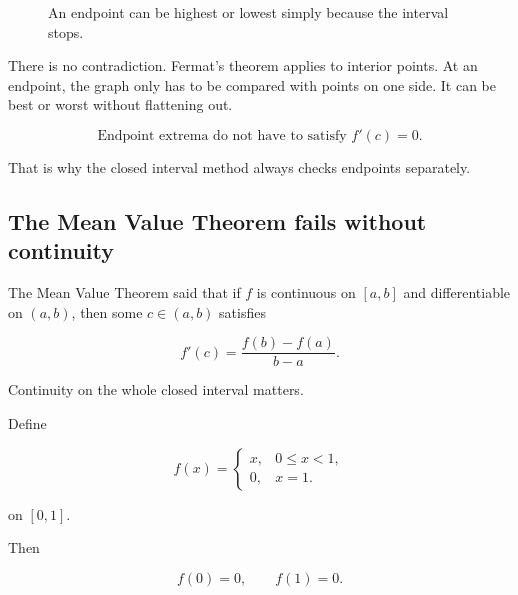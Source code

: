 \begin{figure}[h]
\centering
{}
\caption{An endpoint can be highest or lowest simply because the interval stops.}
\label{fig:fermat-endpoint-warning}
\end{figure}

There is no contradiction.  Fermat's theorem applies to interior points.  At an endpoint,
the graph only has to be compared with points on one side.  It can be best or worst
without flattening out.

\[
\boxed{
\text{Endpoint extrema do not have to satisfy } f'(c)=0.
}
\]

That is why the closed interval method always checks endpoints separately.

\subsection{The Mean Value Theorem fails without continuity}
\label{subsec:mvt-continuity-warning}

The Mean Value Theorem said that if \(f\) is continuous on \([a,b]\) and differentiable
on \((a,b)\), then some \(c\in(a,b)\) satisfies

\[
f'(c)=\frac{f(b)-f(a)}{b-a}.
\]

Continuity on the whole closed interval matters.

Define

\[
f(x)=
\begin{cases}
x, & 0\le x<1,\\
0, & x=1.
\end{cases}
\]

on \([0,1]\).

Then

\[
f(0)=0,
\qquad
f(1)=0.
\]

